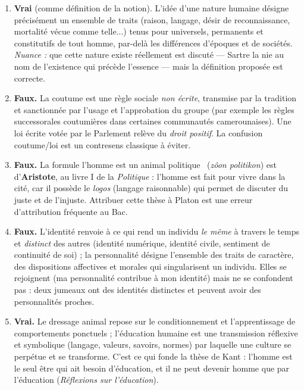 \documentclass[11pt]{article}
\newcommand{\cle}[1]{{\popxbold\color{popdark}#1}}
\begin{document}
\begin{corrige}
\begin{enumerate}
\item \textbf{Vrai} (comme définition de la notion). L'idée d'une \cle{nature humaine} désigne précisément un ensemble de traits (raison, langage, désir de reconnaissance, mortalité vécue comme telle...) tenus pour universels, permanents et constitutifs de tout homme, par-delà les différences d'époques et de sociétés. \emph{Nuance :} que cette nature existe réellement est discuté — Sartre la nie au nom de l'existence qui précède l'essence — mais la définition proposée est correcte.

\item \textbf{Faux.} La \cle{coutume} est une règle sociale \emph{non écrite}, transmise par la tradition et sanctionnée par l'usage et l'approbation du groupe (par exemple les règles successorales coutumières dans certaines communautés camerounaises). Une loi écrite votée par le Parlement relève du \emph{droit positif}. La confusion coutume/loi est un contresens classique à éviter.

\item \textbf{Faux.} La formule \guillemotleft l'homme est un animal politique \guillemotright\ (\emph{zôon politikon}) est d'\textbf{Aristote}, au livre I de la \emph{Politique} : l'homme est fait pour vivre dans la cité, car il possède le \emph{logos} (langage raisonnable) qui permet de discuter du juste et de l'injuste. Attribuer cette thèse à Platon est une erreur d'attribution fréquente au Bac.

\item \textbf{Faux.} L'\cle{identité} renvoie à ce qui rend un individu \emph{le même} à travers le temps et \emph{distinct} des autres (identité numérique, identité civile, sentiment de continuité de soi) ; la \cle{personnalité} désigne l'ensemble des traits de caractère, des dispositions affectives et morales qui singularisent un individu. Elles se rejoignent (ma personnalité contribue à mon identité) mais ne se confondent pas : deux jumeaux ont des identités distinctes et peuvent avoir des personnalités proches.

\item \textbf{Vrai.} Le dressage animal repose sur le conditionnement et l'apprentissage de comportements ponctuels ; l'\cle{éducation} humaine est une transmission réflexive et symbolique (langage, valeurs, savoirs, normes) par laquelle une culture se perpétue et se transforme. C'est ce qui fonde la thèse de Kant : l'homme est le seul être qui ait besoin d'éducation, et il ne peut devenir homme que par l'éducation (\emph{Réflexions sur l'éducation}).
\end{enumerate}
\end{corrige}
\end{document}
